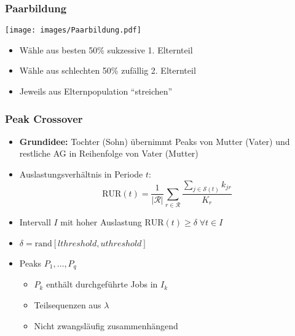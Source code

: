 \begin{frame}[t,noframenumbering]
{\begin{center}
\begin{small}
				
				
			\end{small}
		\end{center}
	}
\end{frame}

\begin{frame}[noframenumbering]
	\frametitle{Paarbildung}
	\texttt{[image: images/Paarbildung.pdf]}\\[3mm]
	\begin{itemize}
		\item Wähle aus besten 50\% sukzessive 1. Elternteil
		\item Wähle aus schlechten 50\% zufällig 2. Elternteil
		\item Jeweils aus Elternpopulation ``streichen''
	\end{itemize}
\end{frame}

\begin{frame}[noframenumbering]
	\frametitle{Peak Crossover}
	\begin{itemize}
		\item \textbf{Grundidee:} Tochter (Sohn) übernimmt Peaks von Mutter (Vater) und restliche AG in Reihenfolge von Vater (Mutter)
		\item Auslastungsverhältnis in Periode $t$:
		\[\mbox{RUR}(t)=\frac{1}{|\mathcal{R}|} \sum_{r \in \mathcal{R}} \frac{\sum_{j \in \mathcal{S}(t)} k_{jr}}{K_r}\]
		\item Intervall $I$ mit hoher Auslastung $\mbox{RUR}(t)\geq \delta \; \forall t \in I$
		\item $\delta = \mbox{rand} [lthreshold, uthreshold]$
		\item Peaks $P_1,\ldots,P_q$
		\begin{itemize}
			\item $P_k$ enthält durchgeführte Jobs in $I_k$
			\item Teilsequenzen aus $\lambda$
			\item Nicht zwangsläufig zusammenhängend
		\end{itemize}
	\end{itemize}
\end{frame}


